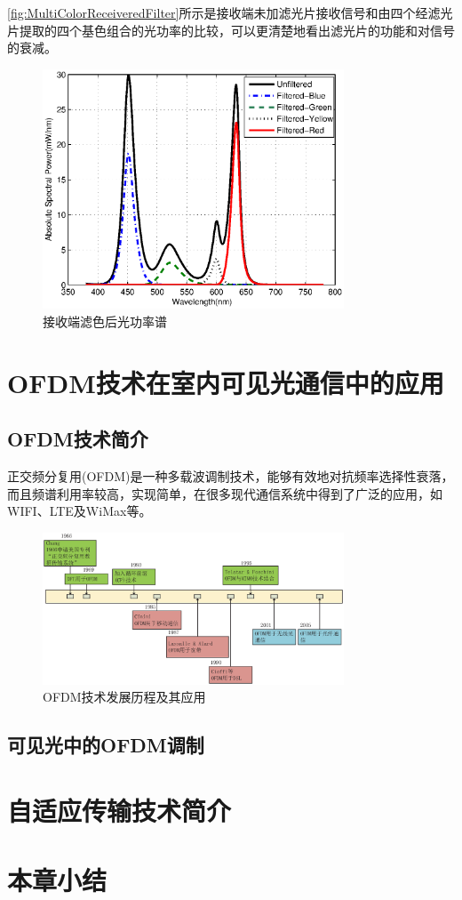 \autoref{fig:MultiColorReceiveredFilter}所示是接收端未加滤光片接收信号和由四个经滤光片提取的四个基色组合的光功率的比较，可以更清楚地看出滤光片的功能和对信号的衰减。
\begin{figure}[htbp]
    \centering
    \includegraphics[width=0.8\textwidth]{figures/Chapter-2/MultiColorReceiveredFilter.eps}
    \caption{接收端滤色后光功率谱}
    \label{fig:MultiColorReceiveredFilter}
\end{figure}
\section{OFDM技术在室内可见光通信中的应用}
\subsection{OFDM技术简介}
正交频分复用(OFDM)是一种多载波调制技术，能够有效地对抗频率选择性衰落，而且频谱利用率较高，实现简单，在很多现代通信系统中得到了广泛的应用，如WIFI、LTE及WiMax等。
\begin{figure}[htbp]
    \centering
    \includegraphics[width=0.8\textwidth]{figures/Chapter-2/HistoryOfOFDM.eps}
    \caption{OFDM技术发展历程及其应用}
    \label{fig:HistoryOfOFDM}
\end{figure}
\subsection{可见光中的OFDM调制}
\section{自适应传输技术简介}
\section{本章小结}
